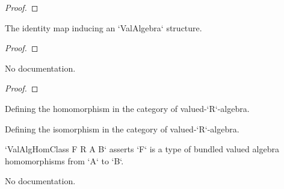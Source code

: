 \begin{proof}
    \leanok
\end{proof}

\begin{theorem}\label{ValAlgebra.id.map_eq_id}
        \leanok
                The identity map inducing an `ValAlgebra` structure.
    \end{theorem}

\begin{proof}
    \leanok
\end{proof}

\begin{theorem}\label{ValAlgebra.id.map_eq_self}
        \leanok
                No documentation.
    \end{theorem}

\begin{proof}
    \leanok
\end{proof}

\begin{definition}\label{ValAlgHom}
        \leanok
                Defining the homomorphism in the category of valued-`R`-algebra.
    \end{definition}

\begin{definition}\label{ValAlgEquiv}
        \leanok
                Defining the isomorphism in the category of valued-`R`-algebra.
    \end{definition}

\begin{definition}\label{ValAlgHomClass}
        \leanok
                `ValAlgHomClass F R A B` asserts `F` is a type of bundled valued algebra homomorphisms
from `A` to `B`.
    \end{definition}

\begin{definition}\label{ValAlgHom.ofAlgHomClassValRingHomClass}
        \leanok
                No documentation.
    \end{definition}

